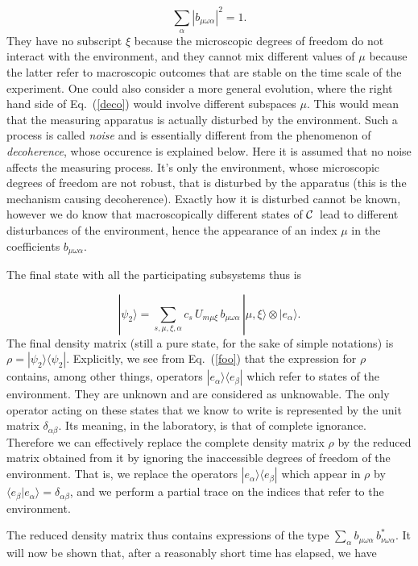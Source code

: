 \documentclass[12pt]{article}
\def\beq{\begin{equation}}
\def\eeq{\end{equation}}
\def\Eq{Eq.~(\ref}
\def\0{\otimes}
\def\6{\langle}
\def\9{\rangle}
\def\cC{$\cal C$}
\begin{document}
\beq \sum_\alpha |b_{\mu\omega\alpha}|^2=1. \label{bnorm}\eeq
They have no subscript $\xi$ because the microscopic degrees of freedom
do not interact with the environment, and they cannot mix different
values of $\mu$ because the latter refer to macroscopic outcomes that
are stable on the time scale of the experiment. One could also consider
a more general evolution, where the right hand side of \Eq{deco}) would
involve different subspaces $\mu$. This would mean that the measuring
apparatus is actually disturbed by the environment. Such a process is
called {\it noise\/} and is essentially different from the phenomenon of
{\it decoherence\/}, whose occurence is explained below. Here it is
assumed that no noise affects the measuring process. It's only the
environment, whose microscopic degrees of freedom are not robust, that
is disturbed by the apparatus (this is the mechanism causing
decoherence). Exactly how it is disturbed cannot be known, however we do
know that macroscopically different states of \cC\ lead to different
disturbances of the environment, hence the appearance of an index $\mu$
in the coefficients $b_{\mu\omega\alpha}$.

The final state with all the participating subsystems thus is

\beq |\psi_2\9=\sum_{s,\mu,\xi,\alpha}c_s\,U_{m\mu\xi}\,
  b_{\mu\omega\alpha}\,|\mu,\xi\9\0|e_\alpha\9. \label{foo}\eeq
The final density matrix (still a pure state, for the sake of simple
notations) is $\rho=|\psi_2\9\6\psi_2|$. Explicitly, we see from
Eq.~(\ref{foo}) that the expression for $\rho$ contains, among other
things, operators $|e_\alpha\9\6e_\beta|$ which refer to states of the
environment. They are unknown and are considered as unknowable. The only
operator acting on these states that we know to write is represented by
the unit matrix $\delta_{\alpha\beta}$. Its meaning, in the laboratory,
is that of complete ignorance. Therefore we can effectively replace the
complete density matrix $\rho$ by the reduced matrix obtained from it by
ignoring the inaccessible degrees of freedom of the environment. That
is, we replace the operators $|e_\alpha\9\6e_\beta|$ which appear in
$\rho$ by $\6e_\beta|e_\alpha\9=\delta_{\alpha\beta}$, and we perform a
partial trace on the indices that refer to the environment.

The reduced density matrix thus contains expressions of the type
$\sum_\alpha b_{\mu\omega\alpha}\,b^*_{\nu\omega\alpha}$. It will now be
shown that, after a reasonably short time has elapsed, we have
\end{document}
